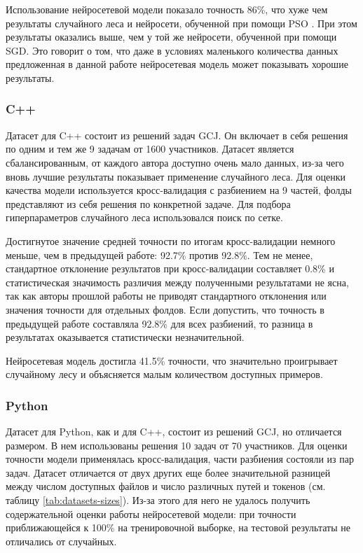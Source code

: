 Использование нейросетевой модели показало точность 86\%, что хуже чем результаты случайного леса и нейросети, обученной при помощи PSO \cite{Yang2017}. При этом результаты оказались выше, чем у той же нейросети, обученной при помощи SGD. Это говорит о том, что даже в условиях маленького количества данных предложенная в данной работе нейросетевая модель может показывать хорошие результаты.

\subsubsection{C++}

Датасет для C++ состоит из решений задач GCJ. Он включает в себя решения по одним и тем же 9 задачам от 1600 участников. Датасет является сбалансированным, от каждого автора доступно очень мало данных, из-за чего вновь лучшие результаты показывает применение случайного леса. Для оценки качества модели используется кросс-валидация с разбиением на 9 частей, фолды представляют из себя решения по конкретной задаче. Для подбора гиперпараметров случайного леса использовался поиск по сетке.

Достигнутое значение средней точности  по итогам кросс-валидации немного меньше, чем в предыдущей работе: 92.7\% против 92.8\%. Тем не менее, стандартное отклонение результатов при кросс-валидации составляет 0.8\% и статистическая значимость различия между полученными результатами не ясна, так как авторы прошлой работы не приводят стандартного отклонения или значения точности для отдельных фолдов. Если допустить, что точность в предыдущей работе составляла 92.8\% для всех разбиений, то разница в результатах оказывается статистически незначительной.

Нейросетевая модель достигла 41.5\% точности, что значительно проигрывает случайному лесу и объясняется малым количеством доступных примеров.

\subsubsection{Python}

Датасет для Python, как и для C++, состоит из решений GCJ, но отличается размером. В нем использованы решения 10 задач от 70 участников. Для оценки точности модели применялась кросс-валидация, части разбиения состояли из пар задач. Датасет отличается от двух других еще более значительной разницей между числом доступных файлов и число различных путей и токенов (см. таблицу \ref{tab:datasets-sizes}). Из-за этого для него не удалось получить содержательной оценки работы нейросетевой модели: при точности приближающейся к 100\% на тренировочной выборке, на тестовой результаты не отличались от случайных.

